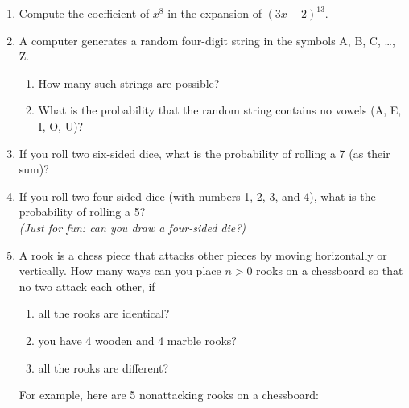 \documentclass{article}
\begin{document}
\begin{enumerate}
\item Compute\marginpar{[2]} the coefficient of $x^8$ in the expansion of $(3x-2)^{13}$.
\item A\marginpar{[3]} computer generates a random four-digit string in the symbols A, B, C, \ldots, Z.
	\begin{enumerate}
	\item How many such strings are possible?
	\item What is the probability that the random string contains no vowels (A, E, I, O, U)?
	\end{enumerate}
\item If\marginpar{[2]} you roll two six-sided dice, what is the probability of rolling a 7 (as their sum)?
\item If\marginpar{[2]} you roll two four-sided dice (with numbers 1, 2, 3, and 4), what is the probability of rolling a 5?\\[1ex]
\textit{(Just for fun: can you draw a four-sided die?)}
\item A rook\marginpar{[5]} is a chess piece that attacks other pieces by moving horizontally or vertically. How many ways can you place $n>0$ rooks on a chessboard so that no two attack each other, if
	\begin{enumerate}
	\item all the rooks are identical?
	\item you have 4 wooden and 4 marble rooks?
	\item all the rooks are different?
	\end{enumerate}
For example, here are 5 nonattacking rooks on a chessboard:
\begin{center}
\end{center}
\end{enumerate}
\hrulefill\\
\label{end}
\end{document}

